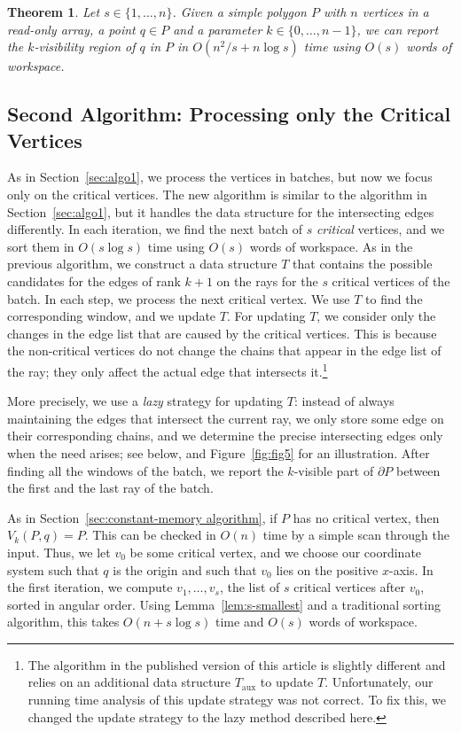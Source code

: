 \documentclass[11pt, a4paper]{article}
\newtheorem{thm}[theorem1]{Theorem}{\bfseries}{\itshape}
\begin{document}
\begin{thm}\label{thm:limited-workspace}
Let $s \in \{1, \dots, n\}$.
Given a simple polygon $P$ with $n$ vertices in a read-only array, 
a point $q \in P$ and a parameter $k \in \{0, \dots, n - 1\}$, we
can report the $k$-visibility region of $q$ in $P$ in 
$O(n^2/s + n\log{s})$ time using $O(s)$ words of workspace.
\end{thm}
\subsection{Second Algorithm: Processing only the Critical Vertices}
\label{algo2}

As in Section~\ref{sec:algo1}, we process the vertices in 
batches, but now we focus only on the critical vertices.
The new algorithm is similar to the algorithm in
Section~\ref{sec:algo1}, but it handles 
the data structure for the intersecting edges differently. In each 
iteration, we find the next batch of $s$ \emph{critical} vertices,
and we sort them in $O(s \log s)$ time using $O(s)$ words of 
workspace. As in the previous algorithm, we construct a data structure 
$T$ that contains the possible candidates for the edges of rank 
$k + 1$ on the rays for the $s$ critical vertices of the batch. 
In each step, we process the next critical vertex. We use $T$ 
to find the corresponding window, and we update $T$.
For updating $T$, we consider only the changes in the edge list
that are caused by the critical vertices. This is because
the non-critical vertices do not change the chains that appear in the 
edge list of the ray; they only affect the actual edge that intersects
it.\footnote{The algorithm in the published version of this
article is slightly different and relies on an
additional data structure $T_\text{aux}$ to update $T$.
Unfortunately, our running time analysis of this update strategy
was not correct. To fix this, we changed the update strategy
to the lazy method described here.}

More precisely, we use a \emph{lazy} strategy for updating $T$:
instead of always maintaining the edges that intersect the current ray, we
only store some edge on their corresponding chains, and we determine
the precise intersecting edges only when the need arises; see below, 
and Figure~\ref{fig:fig5} for an illustration.
After finding all the windows of the batch, we report 
the $k$-visible part of $\partial P$ between the first and the last 
ray of the batch.

As in Section~\ref{sec:constant-memory algorithm}, if $P$ has 
no critical vertex, then $V_k(P,q) = P$. This can be checked
in $O(n)$ time by a simple scan through the input.
Thus, we let $v_0$ be some critical vertex, and 
we choose our coordinate system such that
$q$ is the origin and such that $v_0$ lies on the positive $x$-axis.
In the first iteration, we compute $v_{1}, \dots ,v_{s}$, 
the list of $s$ critical vertices after $v_0$, sorted in angular 
order. Using Lemma~\ref{lem:s-smallest} and a traditional sorting 
algorithm, this takes $O(n + s \log s)$ time and $O(s)$ words of 
workspace.
\end{document}
